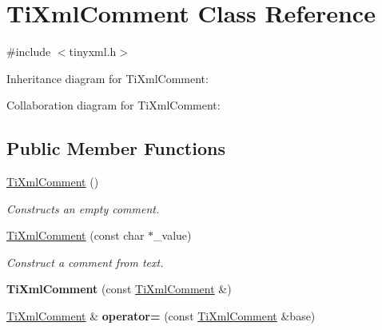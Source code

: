 \hypertarget{class_ti_xml_comment}{
\section{\-Ti\-Xml\-Comment \-Class \-Reference}
\label{class_ti_xml_comment}
}


{\ttfamily \#include $<$tinyxml.\-h$>$}



\-Inheritance diagram for \-Ti\-Xml\-Comment\-:


\-Collaboration diagram for \-Ti\-Xml\-Comment\-:
\subsection*{\-Public \-Member \-Functions}
\begin{DoxyCompactItemize}
\item 
\hypertarget{class_ti_xml_comment_aaa3252031d3e8bd3a2bf51a1c61201b7}{
\hyperlink{class_ti_xml_comment_aaa3252031d3e8bd3a2bf51a1c61201b7}{\-Ti\-Xml\-Comment} ()}
\label{class_ti_xml_comment_aaa3252031d3e8bd3a2bf51a1c61201b7}

\begin{DoxyCompactList}\small\item\em \-Constructs an empty comment. \end{DoxyCompactList}\item 
\hypertarget{class_ti_xml_comment_a37e7802ef17bc03ebe5ae79bf0713d47}{
\hyperlink{class_ti_xml_comment_a37e7802ef17bc03ebe5ae79bf0713d47}{\-Ti\-Xml\-Comment} (const char $\ast$\-\_\-value)}
\label{class_ti_xml_comment_a37e7802ef17bc03ebe5ae79bf0713d47}

\begin{DoxyCompactList}\small\item\em \-Construct a comment from text. \end{DoxyCompactList}\item 
\hypertarget{class_ti_xml_comment_afaec41ac2760ce946ba1590eb5708e50}{
{\bfseries \-Ti\-Xml\-Comment} (const \hyperlink{class_ti_xml_comment}{\-Ti\-Xml\-Comment} \&)}
\label{class_ti_xml_comment_afaec41ac2760ce946ba1590eb5708e50}

\item 
\hypertarget{class_ti_xml_comment_aeceedc15f8b8f9ca0b6136696339b3ac}{
\hyperlink{class_ti_xml_comment}{\-Ti\-Xml\-Comment} \& {\bfseries operator=} (const \hyperlink{class_ti_xml_comment}{\-Ti\-Xml\-Comment} \&base)}
\label{class_ti_xml_comment_aeceedc15f8b8f9ca0b6136696339b3ac}


\end{DoxyCompactItemize}
